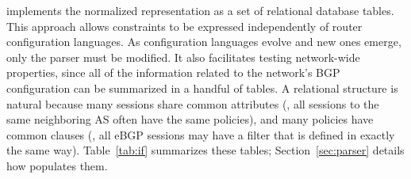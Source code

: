 \rcc implements the normalized representation as a set of relational
database tables.  This approach allows 
constraints to be expressed independently of router configuration
languages.  As configuration languages evolve and new ones emerge, only
the parser must be modified.  It also
facilitates testing network-wide properties, since all of
the information related to the network's BGP configuration can be
summarized in a handful of tables.  A relational structure is natural
because many sessions share common attributes (\eg, all sessions to the
same neighboring AS often have the same policies), and many policies
have common clauses (\eg, all eBGP sessions may have a filter that is
defined in exactly the same way).  Table~\ref{tab:if} summarizes these
tables; Section~\ref{sec:parser} details how \rcc populates them.


